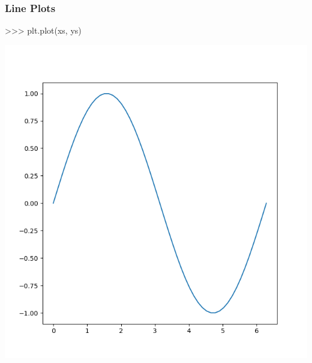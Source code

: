 \documentclass{beamer}
\begin{document}
\begin{frame}[fragile]
  \frametitle{Line Plots}
\begin{pyconcode}
>>> plt.plot(xs, ys)
\end{pyconcode}
\end{frame}

\begin{frame}
  \centerline{\includegraphics[scale=0.5]{image/plot_sin.png}}
\end{frame}
\end{document}
